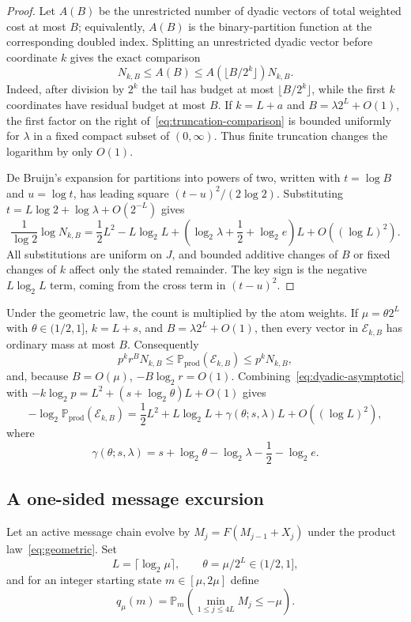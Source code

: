 \documentclass[11pt]{article}
\newcommand{\Prob}{\mathbb P}
\newcommand{\prodprob}{\mathrm{prod}}
\begin{document}
\begin{proof}
Let $A(B)$ be the unrestricted number of dyadic vectors of total weighted cost
at most $B$; equivalently, $A(B)$ is the binary-partition function at the
corresponding doubled index.  Splitting an unrestricted dyadic vector before
coordinate $k$ gives the exact comparison
\[
 N_{k,B}\le A(B)
 \le A(\lfloor B/2^k\rfloor)N_{k,B}.
 \tag{5.5}\label{eq:truncation-comparison}
\]
Indeed, after division by $2^k$ the tail has budget at most
$\lfloor B/2^k\rfloor$, while the first $k$ coordinates have residual budget
at most $B$.  If $k=L+a$ and $B=\lambda2^L+O(1)$, the first factor on the
right of~\eqref{eq:truncation-comparison} is bounded uniformly for
$\lambda$ in a fixed compact subset of $(0,\infty)$.  Thus finite truncation
changes the logarithm by only $O(1)$.

De Bruijn's expansion for partitions into powers of two, written with
$t=\log B$ and $u=\log t$, has leading square $(t-u)^2/(2\log2)$.
Substituting $t=L\log2+\log\lambda+O(2^{-L})$ gives
\[
 \frac{1}{\log2}\log N_{k,B}
 =\frac12L^2-L\log_2L
  +\left(\log_2\lambda+\frac12+\log_2e\right)L
  +O((\log L)^2).
\]
All substitutions are uniform on $J$, and bounded additive changes of $B$
or fixed changes of $k$ affect only the stated remainder.  The key sign is the
negative $L\log_2L$ term, coming from the cross term in $(t-u)^2$.
\end{proof}

Under the geometric law, the count is multiplied by the atom weights.  If
$\mu=\theta2^L$ with $\theta\in(1/2,1]$, $k=L+s$, and
$B=\lambda2^L+O(1)$, then every vector in $\mathcal E_{k,B}$ has ordinary
mass at most $B$.  Consequently
\[
 p^kr^B N_{k,B}
 \le \Prob_{\prodprob}(\mathcal E_{k,B})
 \le p^kN_{k,B},
 \tag{5.6}\label{eq:tilt-sandwich}
\]
and, because $B=O(\mu)$,
$-B\log_2r=O(1)$.  Combining~\eqref{eq:dyadic-asymptotic} with
$-k\log_2p=L^2+(s+\log_2\theta)L+O(1)$ gives
\[
 -\log_2\Prob_{\prodprob}(\mathcal E_{k,B})
 =\frac12L^2+L\log_2L
  +\gamma(\theta;s,\lambda)L+O((\log L)^2),
 \tag{5.7}\label{eq:simplex-prob}
\]
where
\[
 \gamma(\theta;s,\lambda)
 =s+\log_2\theta-\log_2\lambda-\frac12-\log_2e.
 \tag{5.8}\label{eq:gamma}
\]

\subsection{A one-sided message excursion}

Let an active message chain evolve by
$M_j=F(M_{j-1}+X_j)$ under the product law~\eqref{eq:geometric}.  Set
\[
 L=\lceil\log_2\mu\rceil,
 \qquad \theta=\mu/2^L\in(1/2,1],
\]
and for an integer starting state $m\in[\mu,2\mu]$ define
\[
 q_\mu(m)
 =\Prob_m\!\left(\min_{1\le j\le4L}M_j\le-\mu\right).
 \tag{5.9}\label{eq:q}
\]
\end{document}
